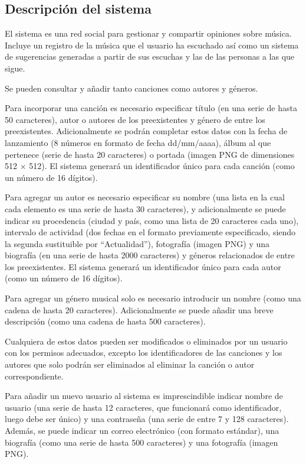 
\subsection{Descripción del sistema} %

El sistema es una red social para gestionar y compartir opiniones sobre música. Incluye un registro de la música que el usuario ha escuchado así como un sistema de sugerencias generadas a partir de sus escuchas y las de las personas a las que sigue.

Se pueden consultar y añadir tanto canciones como autores y géneros.

Para incorporar una canción es necesario especificar título (en una serie de hasta 50 caracteres), autor o autores de los preexistentes y género de entre los preexistentes. Adicionalmente se podrán completar estos datos con la fecha de lanzamiento (8 números en formato de fecha dd/mm/aaaa), álbum al que pertenece (serie de hasta 20 caracteres) o portada (imagen PNG de dimensiones 512 $\times$ 512). El sistema generará un identificador único para cada canción (como un número de 16 dígitos).

Para agregar un autor es necesario especificar su nombre (una lista en la cual cada elemento es una serie de hasta 30 caracteres), y adicionalmente se puede indicar su procedencia (ciudad y país, como una lista de 20 caracteres cada uno), intervalo de actividad (dos fechas en el formato previamente especificado, siendo la segunda sustituible por ``Actualidad''), fotografía (imagen PNG) y una biografía (en una serie de hasta 2000 caracteres) y géneros relacionados de entre los preexistentes. El sistema generará un identificador único para cada autor (como un número de 16 dígitos).

Para agregar un género musical solo es necesario introducir un nombre (como una cadena de hasta 20 caracteres). Adicionalmente se puede añadir una breve descripción (como una cadena de hasta 500 caracteres).

Cualquiera de estos datos pueden ser modificados o eliminados por un usuario con los permisos adecuados, excepto los identificadores de las canciones y los autores que solo podrán ser eliminados al eliminar la canción o autor correspondiente.


Para añadir un nuevo usuario al sistema es imprescindible indicar nombre de usuario (una serie de hasta 12 caracteres, que funcionará como identificador, luego debe ser único) y una contraseña (una serie de entre 7 y 128 caracteres). Además, se puede indicar un correo electrónico (con formato estándar), una biografía (como una serie de hasta 500 caracteres) y una fotografía (imagen PNG).

